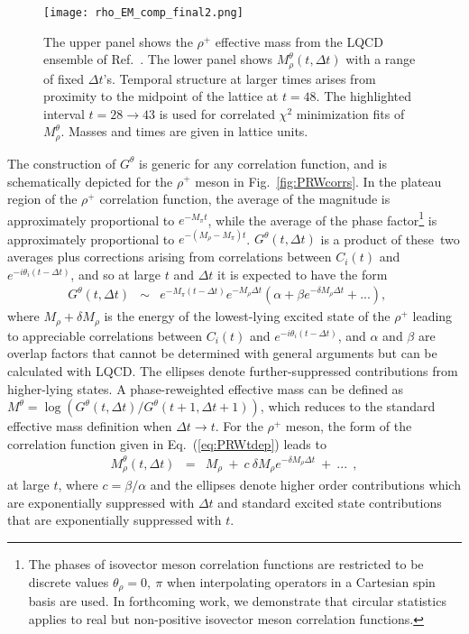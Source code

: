 %
\begin{figure}[!t]
  \centering
	\texttt{[image: rho\_EM\_comp\_final2.png]}
		\caption{
	\label{fig:emps} 
  The upper panel shows the $\rho^+$ effective mass from the LQCD ensemble of Ref.~\cite{Orginos:2015aya}.
	The lower panel shows $M_\rho^\theta(t,\Delta t)$ with a range of fixed $\Delta t$'s.
        Temporal structure at larger times arises from proximity to the midpoint of the lattice at $t=48$.
        The highlighted interval $t=28\rightarrow 43$ is used for correlated $\chi^2$ minimization fits of $M_\rho^\theta$.
	Masses and times are given in lattice units.
	}		
\end{figure}
%

The construction of $G^\theta$ is generic for any correlation function,
and is schematically depicted for the $\rho^+$ meson in Fig.~\ref{fig:PRWcorrs}.
In the plateau region of the  $\rho^+$ correlation function, the average of the  magnitude is approximately proportional to $e^{-M_\pi t}$, 
while the average of the phase factor\footnote{
The phases of isovector meson correlation functions are restricted to be discrete values $\theta_\rho = 0,\ \pi$ 
when interpolating operators in a Cartesian spin basis are used.  In forthcoming work, we demonstrate that circular statistics 
applies to real but non-positive isovector meson correlation functions.
} is approximately proportional to  $e^{-(M_\rho-M_\pi) t}$.
$G^\theta(t,\Delta t)$ is a product of these~two averages plus corrections arising from correlations between 
$C_i(t)$ and $e^{-i\theta_i(t-\Delta t)}$, and so at large $t$ and $\Delta t$ it is expected to have the form 
%
\begin{eqnarray}
G^{\theta}(t,\Delta t) & \sim &
e^{-M_\pi (t-\Delta t) } e^{-M_\rho \Delta t} \left(\alpha+\beta e^{-\delta M_{\rho} \Delta t } +  ... \right),
\;\;\;\;
\label{eq:PRWtdep}
\end{eqnarray}
%
where $M_\rho +\delta M_{\rho}$ is the energy of the lowest-lying excited state of the $\rho^+$
leading to appreciable correlations between $C_i(t)$ and $e^{-i\theta_i(t-\Delta t)}$,
and $\alpha$ and $\beta$ are overlap factors that cannot be determined with general arguments but can be calculated with LQCD.
The ellipses denote further-suppressed contributions from higher-lying states.
A phase-reweighted effective mass can be defined as
$M^\theta=\log\left( G^{\theta}(t,\Delta t) /G^{\theta}(t+1,\Delta t+1) \right)$, which reduces to the standard effective mass definition when $\Delta t\rightarrow t$.
For the $\rho^+$ meson, the form of the correlation function given in Eq.~(\ref{eq:PRWtdep}) leads to
%
\begin{eqnarray}
M_\rho^\theta(t, \Delta t) & = & M_\rho \ +\  c\ \delta M_{\rho} e^{-\delta M_{\rho} \Delta t}\ +\ ...
\ \ ,
\label{eq:PRWEMP}
\end{eqnarray}
%
at large $t$,
where $c=\beta/\alpha$ and the ellipses denote higher order contributions which are exponentially suppressed with
$\Delta t$ and standard excited state contributions that are exponentially suppressed with $t$.



